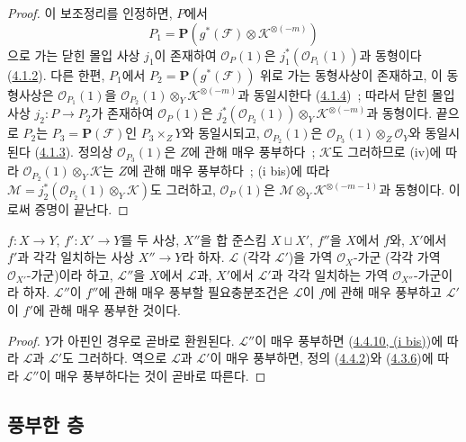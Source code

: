 \begin{proof}
이 보조정리를 인정하면, $P$에서
\[
  P_1=\mathbf{P}(g^*(\mathcal{F})\otimes\mathcal{K}^{\otimes(-m)})
\]
으로 가는 닫힌 몰입 사상 $j_1$이 존재하여 $\mathcal{O}_P(1)$은
$j_1^*(\mathcal{O}_{P_1}(1))$과 동형이다
(\hyperref[II.4.1.2-ko]{4.1.2}). 다른 한편, $P_1$에서
$P_2=\mathbf{P}(g^*(\mathcal{F}))$ 위로 가는 동형사상이 존재하고,
이 동형사상은 $\mathcal{O}_{P_1}(1)$을
$\mathcal{O}_{P_2}(1)\otimes_Y\mathcal{K}^{\otimes(-m)}$과 동일시한다
(\hyperref[II.4.1.4-ko]{4.1.4})~; 따라서 닫힌 몰입 사상
$j_2:P\to P_2$가 존재하여 $\mathcal{O}_P(1)$은
$j_2^*(\mathcal{O}_{P_2}(1))\otimes_Y\mathcal{K}^{\otimes(-m)}$과
동형이다. 끝으로 $P_2$는 $P_3=\mathbf{P}(\mathcal{F})$인
$P_3\times_ZY$와 동일시되고, $\mathcal{O}_{P_2}(1)$은
$\mathcal{O}_{P_3}(1)\otimes_Z\mathcal{O}_Y$와 동일시된다
(\hyperref[II.4.1.3-ko]{4.1.3}). 정의상 $\mathcal{O}_{P_3}(1)$은
$Z$에 관해 매우 풍부하다~; $\mathcal{K}$도 그러하므로 (iv)에 따라
$\mathcal{O}_{P_2}(1)\otimes_Y\mathcal{K}$는 $Z$에 관해 매우
풍부하다~; (i bis)에 따라
$\mathcal{M}=j_2^*(\mathcal{O}_{P_2}(1)\otimes_Y\mathcal{K})$도
그러하고, $\mathcal{O}_P(1)$은
$\mathcal{M}\otimes_Y\mathcal{K}^{\otimes(-m-1)}$과 동형이다. 이로써
증명이 끝난다.
\end{proof}

\begin{proposition}[4.4.11]
\label{II.4.4.11-ko}
$f:X\to Y$, $f':X'\to Y$를 두 사상, $X''$을 합 준스킴
$X\sqcup X'$, $f''$을 $X$에서 $f$와, $X'$에서 $f'$과 각각 일치하는
사상 $X''\to Y$라 하자. $\mathcal{L}$ (각각 $\mathcal{L}'$)을 가역
$\mathcal{O}_X$-가군 (각각 가역 $\mathcal{O}_{X'}$-가군)이라 하고,
$\mathcal{L}''$을 $X$에서 $\mathcal{L}$과, $X'$에서
$\mathcal{L}'$과 각각 일치하는 가역 $\mathcal{O}_{X''}$-가군이라 하자.
$\mathcal{L}''$이 $f''$에 관해 매우 풍부할 필요충분조건은
$\mathcal{L}$이 $f$에 관해 매우 풍부하고 $\mathcal{L}'$이 $f'$에
관해 매우 풍부한 것이다.
\end{proposition}

\begin{proof}
$Y$가 아핀인 경우로 곧바로 환원된다. $\mathcal{L}''$이 매우
풍부하면 (\hyperref[II.4.4.10-ko]{4.4.10, (i bis)})에 따라
$\mathcal{L}$과 $\mathcal{L}'$도 그러하다. 역으로 $\mathcal{L}$과
$\mathcal{L}'$이 매우 풍부하면, 정의
(\hyperref[II.4.4.2-ko]{4.4.2})와
(\hyperref[II.4.3.6-ko]{4.3.6})에 따라 $\mathcal{L}''$이 매우
풍부하다는 것이 곧바로 따른다.
\end{proof}

\subsection{풍부한 층}
\label{subsection:II.4.5-ko}

